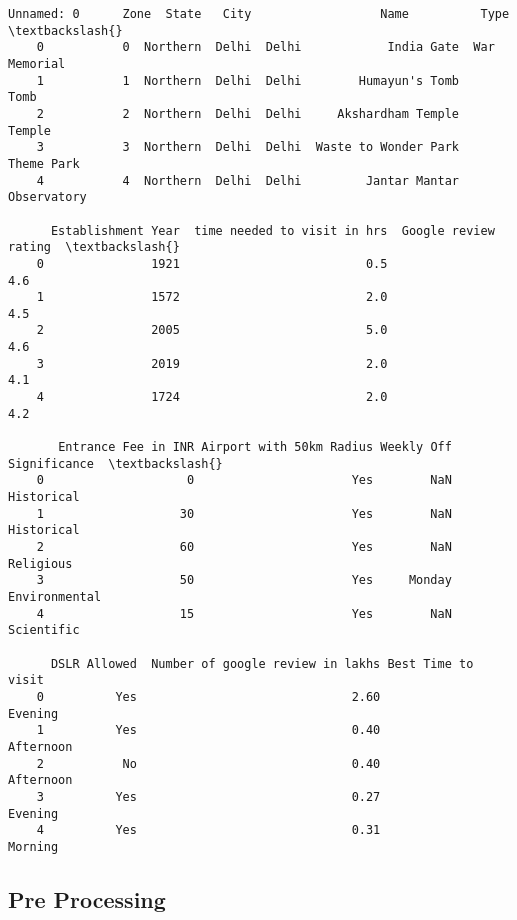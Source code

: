 \documentclass[11pt]{article}
\makeatletter
\newcommand{\boxspacing}{\kern\kvtcb@left@rule\kern\kvtcb@boxsep}
\newcommand{\prompt}[4]{
        {\ttfamily\llap{{\color{#2}[#3]:\hspace{3pt}#4}}\vspace{-\baselineskip}}
    }
\makeatother
\begin{document}
                \begin{tcolorbox}[breakable, size=fbox, boxrule=.5pt, pad at break*=1mm, opacityfill=0]
    \prompt{Out}{outcolor}{7}{\boxspacing}
    \begin{Verbatim}[commandchars=\\\{\}]
       Unnamed: 0      Zone  State   City                  Name          Type  \textbackslash{}
    0           0  Northern  Delhi  Delhi            India Gate  War Memorial
    1           1  Northern  Delhi  Delhi        Humayun's Tomb          Tomb
    2           2  Northern  Delhi  Delhi     Akshardham Temple        Temple
    3           3  Northern  Delhi  Delhi  Waste to Wonder Park    Theme Park
    4           4  Northern  Delhi  Delhi         Jantar Mantar   Observatory
    
      Establishment Year  time needed to visit in hrs  Google review rating  \textbackslash{}
    0               1921                          0.5                   4.6
    1               1572                          2.0                   4.5
    2               2005                          5.0                   4.6
    3               2019                          2.0                   4.1
    4               1724                          2.0                   4.2
    
       Entrance Fee in INR Airport with 50km Radius Weekly Off   Significance  \textbackslash{}
    0                    0                      Yes        NaN     Historical
    1                   30                      Yes        NaN     Historical
    2                   60                      Yes        NaN      Religious
    3                   50                      Yes     Monday  Environmental
    4                   15                      Yes        NaN     Scientific
    
      DSLR Allowed  Number of google review in lakhs Best Time to visit
    0          Yes                              2.60            Evening
    1          Yes                              0.40          Afternoon
    2           No                              0.40          Afternoon
    3          Yes                              0.27            Evening
    4          Yes                              0.31            Morning
    \end{Verbatim}
    \end{tcolorbox}
            
        \subsection{Pre Processing}\label{pre-processing}
    
\end{document}
